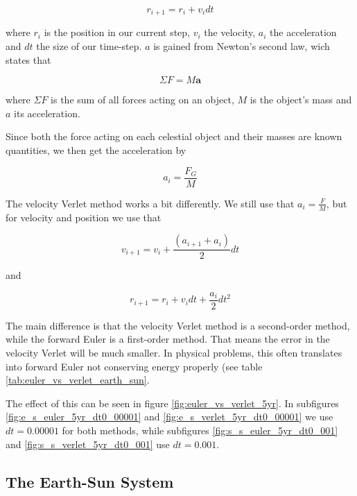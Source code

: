 \documentclass[10pt,showpacs,preprintnumbers,footinbib,amsmath,amssymb,aps,prl,twocolumn,groupedaddress,superscriptaddress,showkeys]{revtex4-1}
\begin{document}
\begin{equation}
r_{i+1} = r_i + v_i dt
\end{equation}

where $r_i$ is the position in our current step, $v_i$ the velocity, $a_i$ the acceleration and $dt$ the size of our time-step. $a$ is gained from Newton's second law, wich states that 

\begin{equation}
\Sigma F = M\textbf{a}
\end{equation}

where $\Sigma F$ is the sum of all forces acting on an object, $M$ is the object's mass and $a$ its acceleration.

Since both the force acting on each celestial object and their masses are known quantities, we then get the acceleration by 

\begin{equation}
a_i = \frac{F_G}{M}
\end{equation}

The velocity Verlet method works a bit differently. We still use that $a_i = \frac{F}{M}$, but for velocity and position we use that 

\begin{equation}
v_{i+1} = v_i + \frac{(a_{i+1} + a_i)}{2}dt
\end{equation}

and 

\begin{equation}
r_{i+1} = r_i +  v_i dt + \frac{a_i}{2}dt^2
\end{equation}

The main difference is that the velocity Verlet method is a second-order method, while the forward Euler is a first-order method. That means the error in the velocity Verlet will be much smaller. In physical problems, this often translates into forward Euler not conserving energy properly (see table \ref{tab:euler_vs_verlet_earth_sun}.

The effect of this can be seen in figure \ref{fig:euler_vs_verlet_5yr}. In subfigures \ref{fig:e_s_euler_5yr_dt0_00001} and \ref{fig:e_s_verlet_5yr_dt0_00001} we use $dt = 0.00001$ for both methods, while subfigures \ref{fig:s_s_euler_5yr_dt0_001} and \ref{fig:s_s_verlet_5yr_dt0_001} use $dt = 0.001$. 




\subsection{The Earth-Sun System}
\end{document}

